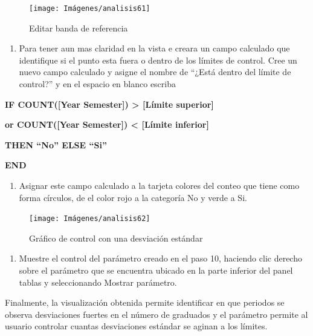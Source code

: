\documentclass[
]{book}
\providecommand{\tightlist}{%
  \setlength{\itemsep}{0pt}\setlength{\parskip}{0pt}}
\begin{document}
\begin{figure}

{\centering \texttt{[image: Imágenes/analisis61]} 

}

\caption{Editar banda de referencia}\label{fig:paso15graficodecontrol-fig}
\end{figure}

\begin{enumerate}
\def\labelenumi{\arabic{enumi}.}
\setcounter{enumi}{15}
\tightlist
\item
  Para tener aun mas claridad en la vista e creara un campo calculado que identifique si el punto esta fuera o dentro de los límites de control. Cree un nuevo campo calculado y asigne el nombre de ``¿Está dentro del límite de control?'' y en el espacio en blanco escriba
\end{enumerate}

\textbf{IF COUNT({[}Year Semester{]}) \textgreater{} {[}Límite superior{]}}

\textbf{or COUNT({[}Year Semester{]}) \textless{} {[}Límite inferior{]}}

\textbf{THEN ``No'' ELSE ``Si''}

\textbf{END}

\begin{enumerate}
\def\labelenumi{\arabic{enumi}.}
\setcounter{enumi}{16}
\tightlist
\item
  Asignar este campo calculado a la tarjeta colores del conteo que tiene como forma círculos, de el color rojo a la categoría No y verde a Si.
\end{enumerate}

\begin{figure}

{\centering \texttt{[image: Imágenes/analisis62]} 

}

\caption{Gráfico de control con una desviación estándar}\label{fig:paso17graficodecontrol-fig}
\end{figure}

\begin{enumerate}
\def\labelenumi{\arabic{enumi}.}
\setcounter{enumi}{17}
\tightlist
\item
  Muestre el control del parámetro creado en el paso 10, haciendo clic derecho sobre el parámetro que se encuentra ubicado en la parte inferior del panel tablas y seleccionando Mostrar parámetro.
\end{enumerate}

Finalmente, la visualización obtenida permite identificar en que periodos se observa desviaciones fuertes en el número de graduados y el parámetro permite al usuario controlar cuantas desviaciones estándar se aginan a los límites.
\end{document}

